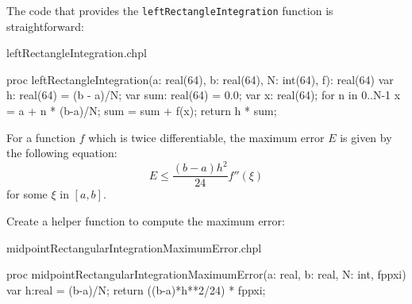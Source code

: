The code that provides the \lstinline{leftRectangleIntegration} function is straightforward:
\begin{chapelsource}{leftRectangleIntegration.chpl}
\begin{chapel}
proc leftRectangleIntegration(a: real(64), b: real(64), N: int(64), f): real(64){
  var h: real(64) = (b - a)/N;
  var sum: real(64) = 0.0;
  var x: real(64);
  for n in 0..N-1 {
    x = a + n * (b-a)/N;
    sum = sum + f(x);
  }
  return h * sum;
}
\end{chapel}
\end{chapelsource}

For a function $f$ which is twice differentiable, the maximum error $E$ is given by
the following equation:
\begin{equation}
E \leq \frac{(b-a)h^2}{24} f''(\xi) \label{eq:rectangle-max-error}
\end{equation}
for some $\xi$ in $[a,b]$.

Create a helper function to compute the maximum error:
\begin{chapelhelper}{midpointRectangularIntegrationMaximumError.chpl}
\begin{chapel}
proc midpointRectangularIntegrationMaximumError(a: real, b: real, N: int, fppxi){
  var h:real = (b-a)/N;
  return ((b-a)*h**2/24) * fppxi;
}
\end{chapel}
\end{chapelhelper}
